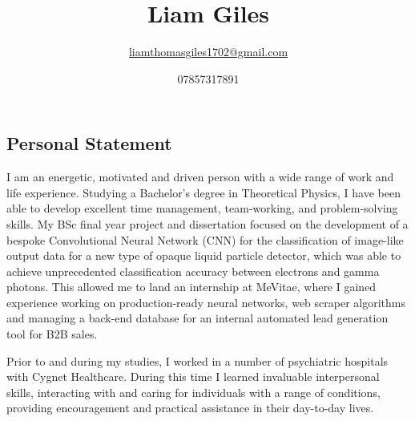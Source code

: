 \documentclass[11pt, a4paper, draft]{article}
\title{Liam Giles}
\author{\url{liamthomasgiles1702@gmail.com}}
\date{07857317891}
\begin{document}
\maketitle
\thispagestyle{empty}

\subsection*{Personal Statement}
I am an energetic, motivated and driven person with a wide range of work and life experience. Studying a Bachelor's degree in Theoretical Physics, I have been able to develop excellent time management, team-working, and problem-solving skills. My BSc final year project and dissertation focused on the development of a bespoke Convolutional Neural Network (CNN) for the classification of image-like output data for a new type of opaque liquid particle detector, which was able to achieve unprecedented classification accuracy between electrons and gamma photons. This allowed me to land an internship at MeVitae, where I gained experience working on production-ready neural networks, web scraper algorithms and managing a back-end database for an internal automated lead generation tool for B2B sales.

Prior to and during my studies, I worked in a number of psychiatric hospitals with Cygnet Healthcare. During this time I learned invaluable interpersonal skills, interacting with and caring for individuals with a range of conditions, providing encouragement and practical assistance in their day-to-day lives.
\end{document}
